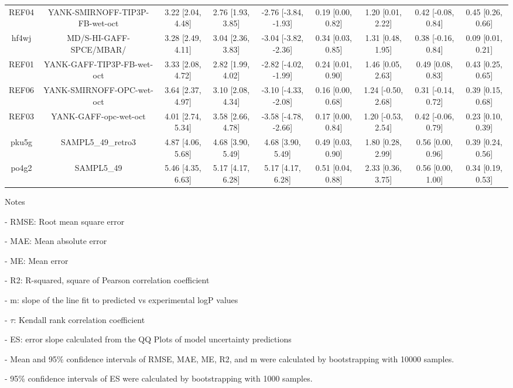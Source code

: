 \documentclass{article}
\begin{document}
\begin{center}
\begin{longtable}{|ccccccccc|}
 REF04 &                     YANK-SMIRNOFF-TIP3P-FB-wet-oct &  3.22 [2.04, 4.48] &  2.76 [1.93, 3.85] &  -2.76 [-3.84, -1.93] &  0.19 [0.00, 0.82] &    1.20 [0.01, 2.22] &   0.42 [-0.08, 0.84] &     0.45 [0.26, 0.66] \\
 hf4wj &                            MD/S-HI-GAFF-SPCE/MBAR/ &  3.28 [2.49, 4.11] &  3.04 [2.36, 3.83] &  -3.04 [-3.82, -2.36] &  0.34 [0.03, 0.85] &    1.31 [0.48, 1.95] &   0.38 [-0.16, 0.84] &     0.09 [0.01, 0.21] \\
 REF01 &                         YANK-GAFF-TIP3P-FB-wet-oct &  3.33 [2.08, 4.72] &  2.82 [1.99, 4.02] &  -2.82 [-4.02, -1.99] &  0.24 [0.01, 0.90] &    1.46 [0.05, 2.63] &    0.49 [0.08, 0.83] &     0.43 [0.25, 0.65] \\
 REF06 &                          YANK-SMIRNOFF-OPC-wet-oct &  3.64 [2.37, 4.97] &  3.10 [2.08, 4.34] &  -3.10 [-4.33, -2.08] &  0.16 [0.00, 0.68] &   1.24 [-0.50, 2.68] &   0.31 [-0.14, 0.72] &     0.39 [0.15, 0.68] \\
 REF03 &                              YANK-GAFF-opc-wet-oct &  4.01 [2.74, 5.34] &  3.58 [2.66, 4.78] &  -3.58 [-4.78, -2.66] &  0.17 [0.00, 0.84] &   1.20 [-0.53, 2.54] &   0.42 [-0.06, 0.79] &     0.23 [0.10, 0.39] \\
 pku5g &                                 SAMPL5\_49\_retro3 &  4.87 [4.06, 5.68] &  4.68 [3.90, 5.49] &     4.68 [3.90, 5.49] &  0.49 [0.03, 0.90] &    1.80 [0.28, 2.99] &    0.56 [0.00, 0.96] &     0.39 [0.24, 0.56] \\
 po4g2 &                                         SAMPL5\_49 &  5.46 [4.35, 6.63] &  5.17 [4.17, 6.28] &     5.17 [4.17, 6.28] &  0.51 [0.04, 0.88] &    2.33 [0.36, 3.75] &    0.56 [0.00, 1.00] &     0.34 [0.19, 0.53] \\
\end{longtable}
\end{center}

Notes

- RMSE: Root mean square error

- MAE: Mean absolute error

- ME: Mean error

- R2: R-squared, square of Pearson correlation coefficient

- m: slope of the line fit to predicted vs experimental logP values

- $\tau$:  Kendall rank correlation coefficient

- ES: error slope calculated from the QQ Plots of model uncertainty predictions

- Mean and 95\% confidence intervals of RMSE, MAE, ME, R2, and m were calculated by bootstrapping with 10000 samples.

- 95\% confidence intervals of ES were calculated by bootstrapping with 1000 samples.\end{document}
\end{document}
